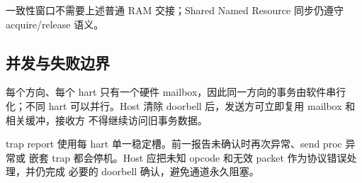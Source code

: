 \documentclass[../dayan_kernel_manual.tex]{subfiles}
\begin{document}
一致性窗口不需要上述普通 RAM 交接；Shared Named Resource 同步仍遵守
acquire/release 语义。

\subsection{并发与失败边界}

每个方向、每个 hart 只有一个硬件 mailbox，因此同一方向的事务由软件串行化；不同
hart 可以并行。Host 清除 doorbell 后，发送方可立即复用 mailbox 和相关缓冲，接收方
不得继续访问旧事务数据。

trap report 使用每 hart 单一稳定槽。前一报告未确认时再次异常、send proc 异常或
嵌套 trap 都会停机。Host 应把未知 opcode 和无效 packet 作为协议错误处理，并仍完成
必要的 doorbell 确认，避免通道永久阻塞。
\end{document}
